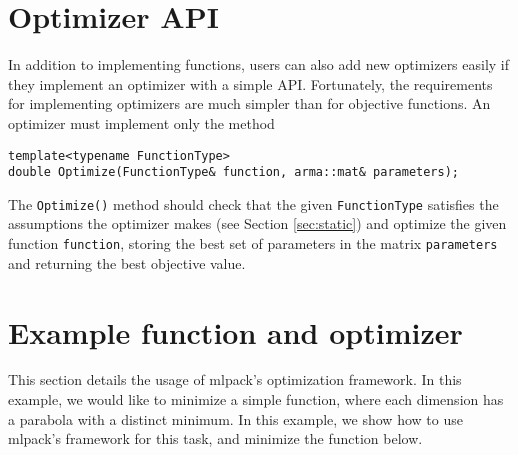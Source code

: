 \documentclass{article}
\begin{document}
\vspace*{-0.3em}
\section{Optimizer API}
\vspace*{-0.4em}

In addition to implementing functions, users can also add new optimizers easily
if they implement an optimizer with a simple API.  Fortunately, the requirements
for implementing optimizers are much simpler than for objective functions.  An
optimizer must implement only the method

\vspace*{-0.5em}
\begin{verbatim}
template<typename FunctionType>
double Optimize(FunctionType& function, arma::mat& parameters);
\end{verbatim}
\vspace*{-0.5em}

The {\tt Optimize()} method should check that the given {\tt FunctionType}
satisfies the assumptions the optimizer makes (see Section \ref{sec:static}) and
optimize the given function {\tt function}, storing the best set of parameters
in the matrix {\tt parameters} and returning the best objective value.

\vspace*{-0.5em}
\section{Example function and optimizer}
\vspace*{-0.6em}

This section details the usage of mlpack's optimization framework. In this
example, we would like to minimize a simple function, where each dimension has a
parabola with a distinct minimum. In this example, we show how to use mlpack’s
framework for this task, and minimize the function below.
\end{document}
